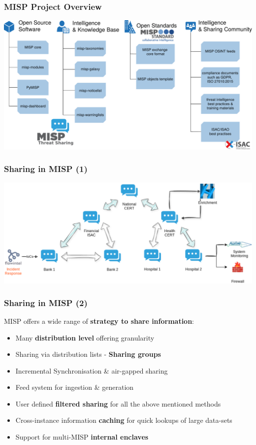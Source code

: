 \begin{frame}
    \frametitle{MISP Project Overview}
    \begin{center}
        \includegraphics[width=0.85\linewidth]{misp-overview-simplified.pdf}
    \end{center}
\end{frame}


\begin{frame}
    \frametitle{Sharing in MISP (1)}
    \begin{center}
        \includegraphics[width=0.99\linewidth]{misp-infosharing.png}
    \end{center}
\end{frame}

\begin{frame}
    \frametitle{Sharing in MISP (2)}
    MISP offers a wide range of \textbf{strategy to share information}:
    \begin{itemize}
        \item Many {\bf distribution level} offering granularity
        \item Sharing via distribution lists - {\bf Sharing groups}
        \item Incremental Synchronisation \& air-gapped sharing
        \item Feed system for ingestion \& generation
        \item User defined {\bf filtered sharing} for all the above mentioned methods
        \item Cross-instance information {\bf caching} for quick lookups of large data-sets
        \item Support for multi-MISP \textbf{internal enclaves}
    \end{itemize}
\end{frame}

